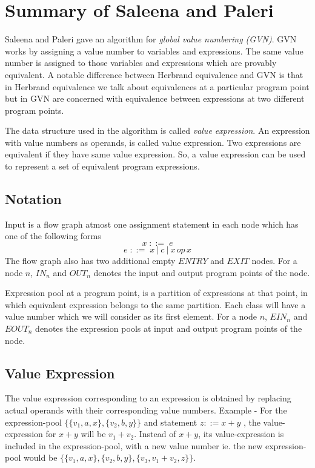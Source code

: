 \chapter{Summary of Saleena and Paleri}
\label{chap:chapter4}

Saleena and Paleri gave an algorithm for 
\textit{global value numbering (GVN)}. GVN works by assigning a value 
number to variables and expressions. The same value number is 
assigned to those variables and expressions which are provably 
equivalent. A notable difference between Herbrand equivalence and GVN 
is that in Herbrand equivalence we talk about equivalences at a 
particular program point but in GVN are concerned with equivalence 
between expressions at two different program points.

The data structure used in the algorithm is called \textit{value 
expression}. An expression with value numbers as operands, is called 
value expression. Two expressions are equivalent if they have same 
value expression. So, a value expression can be used to represent a 
set of equivalent program expressions.

\section{Notation}
Input is a flow graph atmost one assignment statement in each node
which has one of the following forms
$$x\; ::=\; e$$ 
$$e\; ::=\; x\: |\: c\: |\: x\,op\,x$$
The flow graph also has two additional empty $ENTRY$ and $EXIT$ nodes.
For a node $n$, $IN_n$ and $OUT_n$ denotes the input and output 
program points of the node.

Expression pool at a program point, is a partition of expressions at 
that point, in which equivalent expression belongs to the same 
partition. Each class will have a value number which we will consider 
as its first element. For a node $n$, $EIN_n$ and $EOUT_n$ denotes 
the expression pools at input and output program points of the node.

\section{Value Expression}
The value expression corresponding to an expression is obtained by 
replacing actual operands with their corresponding value numbers.
Example - For the expression-pool $\{\{v_1, a, x\}, \{v_2, b, y \}\}$ 
and statement $z ::= x + y$ , the value-expression for $x + y$ will be
$v_1 + v_2$. Instead of $x + y$, its value-expression is included in 
the expression-pool, with a new value number ie. the new 
expression-pool would be 
$\{\{v_1, a, x\},\{v_2, b, y\}, \{v_3, v_1 + v_2, z\}\}$.

